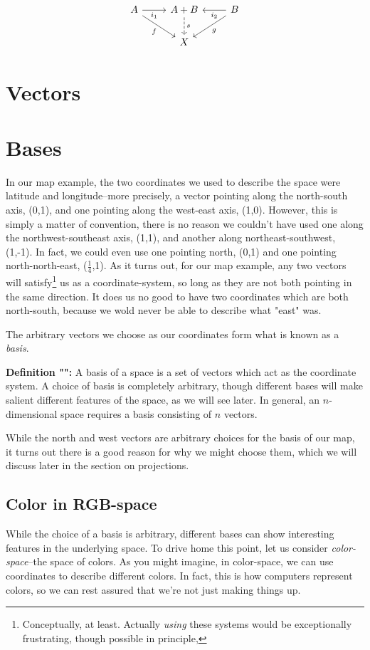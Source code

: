 \documentclass[12pt]{book}
\newcommand{\cdr}[1]{\arrow[swap]{r}{#1}}
\newcommand{\cdl}[1]{\arrow{l}{#1}}
\newcommand{\what}{}
\newcommand{\defn}[2]{\renewcommand{\what}{#1}\textbf{Definition "\titlecap{#1}":} #2}
\newcommand{\coord}[1]{(#1)}
\begin{document}
$$\begin{tikzcd}
A \arrow[swap]{dr}{f} \cdr{i_1} & A + B \arrow[dashed]{d}{s} & \cdl{i_2} \arrow{dl}{g} B \\
\phantom{} & X &
\end{tikzcd}$$

\section{Vectors}
\section{Bases}
In our map example, the two coordinates we used to describe the space were latitude and longitude--more precisely, a
vector pointing along the north-south axis, \coord{0,1}, and one pointing along the west-east axis, \coord{1,0}.
However, this is simply a matter of convention, there is no reason we couldn't have used one along the
northwest-southeast axis, \coord{1,1}, and another along northeast-southwest, \coord{1,-1}. In fact, we could even use
one pointing north, \coord{0,1} and one pointing north-north-east, \coord{$\frac{1}{4}$,1}. As it turns out, for our
map example, any two vectors will satisfy\footnote{Conceptually, at least. Actually \textit{using} these systems would
be exceptionally frustrating, though possible in principle,} us as a coordinate-system, so long as they are not both
pointing in the same direction.  It does us no good to have two coordinates which are both north-south, because we wold
never be able to describe what "east" was.

The arbitrary vectors we choose as our coordinates form what is known as a \textit{basis}.

\defn{basis}{A basis of a space is a set of vectors which act as the coordinate system. A choice of basis is completely
arbitrary, though different bases will make salient different features of the space, as we will see later. In general,
an $n$-dimensional space requires a basis consisting of $n$ vectors.}

While the north and west vectors are arbitrary choices for the basis of our map, it turns out there is a good reason for
why we might choose them, which we will discuss later in the section on projections.

\subsection{Color in RGB-space}
While the choice of a basis is arbitrary, different bases can show interesting features in the underlying space. To
drive home this point, let us consider \textit{color-space}--the space of colors. As you
might imagine, in color-space, we can use coordinates to describe different colors. In fact, this is how computers
represent colors, so we can rest assured that we're not just making things up.
\end{document}

